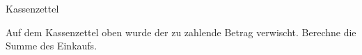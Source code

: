 \documentclass[12pt,a5paper,landscape]{scrartcl}
\begin{document}
	\begin{karte1}{Kassenzettel}

		Auf dem Kassenzettel oben wurde der zu zahlende Betrag verwischt. Berechne die Summe des Einkaufs.

	\end{karte1}

	\leereKarte
\end{document}
